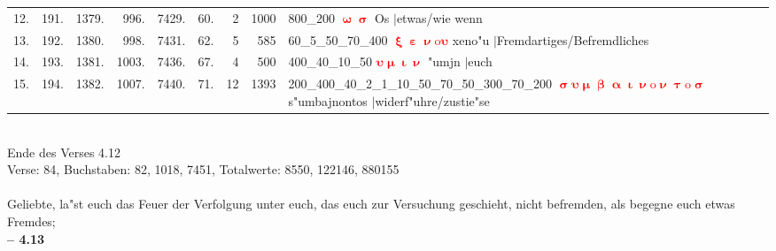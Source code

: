 \documentclass[a4paper,10pt,landscape]{article}
\begin{document}
\begin{tabular}{rrrrrrrrp{120mm}}
12.&191.&1379.&996.&7429.&60.&2&1000&800\_200 \textcolor{red}{$\boldsymbol{\upomega\upsigma}$} Os $|$etwas/wie wenn\\
13.&192.&1380.&998.&7431.&62.&5&585&60\_5\_50\_70\_400 \textcolor{red}{$\boldsymbol{\upxi\upepsilon\upnu\mathrm{o}\upsilon}$} xeno"u $|$Fremdartiges/Befremdliches\\
14.&193.&1381.&1003.&7436.&67.&4&500&400\_40\_10\_50 \textcolor{red}{$\boldsymbol{\upsilon\upmu\upiota\upnu}$} "umjn $|$euch\\
15.&194.&1382.&1007.&7440.&71.&12&1393&200\_400\_40\_2\_1\_10\_50\_70\_50\_300\_70\_200 \textcolor{red}{$\boldsymbol{\upsigma\upsilon\upmu\upbeta\upalpha\upiota\upnu\mathrm{o}\upnu\uptau\mathrm{o}\upsigma}$} s"umbajnontos $|$widerf"uhre/zustie"se\\
\end{tabular}\medskip \\
Ende des Verses 4.12\\
Verse: 84, Buchstaben: 82, 1018, 7451, Totalwerte: 8550, 122146, 880155\\
\\
Geliebte, la"st euch das Feuer der Verfolgung unter euch, das euch zur Versuchung geschieht, nicht befremden, als begegne euch etwas Fremdes;\\
\newpage 
{\bf -- 4.13}\\
\medskip \\
\end{document}

